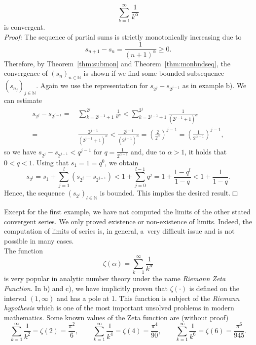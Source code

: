 \begin{example}
\begin{enumerate}[(a)]
\[ \sum_{k=1}^\infty \frac1{k^\alpha}\]
is convergent.\\
{\em Proof:} The sequence of partial sums is strictly monotonically increasing due to
\[s_{n+1}-s_n=\frac1{(n+1)^\alpha}\geq0.\]
Therefore, by Theorem~\ref{thm:submon} and Theorem~\ref{thm:monbndseq}, the convergence of $(s_n)_{n\in\mathbb{N}}$ is shown if we find some 
bounded subsequence $(s_{n_j})_{j\in\mathbb{N}}$. Again we use the representation for $s_{2^j}-s_{2^{j-1}}$
as in example b). We can estimate
\[
\begin{aligned}
s_{2^j}-s_{2^{j-1}}=&\,\sum_{k=2^{j-1}+1}^{2^j}\frac1{k^\alpha}<\sum_{k=2^{j-1}+1}^{2^j}\frac1{(2^{j-1}+1)^\alpha}\\
=&\,\frac{2^{j-1}}{(2^{j-1}+1)^\alpha}< \frac{2^{j-1}}{(2^{j-1})^\alpha}=\left(\frac{2}{2^\alpha}\right)^{j-1}=\left(\frac{1}{2^{\alpha-1}}\right)^{j-1},
\end{aligned}\]
so we have $s_{2^j}-s_{2^{j-1}}<q^{j-1}$ for $q=\frac{1}{2^{\alpha-1}}$ and, due to $\alpha>1$, it holds that $0<q<1$. Using that $s_1=1=q^0$, we obtain
\[s_{2^l}=s_1+\sum_{j=1}^l(s_{2^j}-s_{2^{j-1}})<1+\sum_{j=0}^{l-1}q^j=1+\frac{1-q^l}{1-q}<1+\frac{1}{1-q}.\]
Hence, the sequence $(s_{2^l})_{l\in\mathbb{N}}$ is bounded. This implies the desired result.\hfill$\Box$
\end{enumerate}
\end{example}
\begin{Remark}{}
Except for the first example, we have not computed the limits of the other stated convergent series. 
We only proved existence or non-existence of limits. Indeed, the computation of limits of series is, in general, a~very difficult issue and is not possible in many cases.\\
The function
\[\zeta(\alpha)=\sum_{k=1}^\infty \frac1{k^\alpha}\]
is very popular in analytic number theory under the name \emph{Riemann Zeta Function}. In b) and c), we have implicitly proven that $\zeta(\cdot)$ is defined on the interval $(1,\infty)$ and has a pole at 1. This function is subject of the {\em Riemann hypothesis} which is one of the most important unsolved problems in modern mathematics. Some known values of the Zeta function are (without proof)
\[\sum_{k=1}^\infty \frac1{k^2}=\zeta(2)=\frac{\pi^2}6,\qquad
\sum_{k=1}^\infty \frac1{k^4}=\zeta(4)=\frac{\pi^4}{90},\qquad
\sum_{k=1}^\infty \frac1{k^6}=\zeta(6)=\frac{\pi^6}{945}.
\]
\end{Remark}{}

